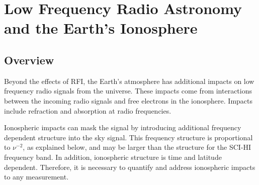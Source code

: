 \chapter{Low Frequency Radio Astronomy and the Earth's Ionosphere}\label{Ch:Iono}


\section{Overview}

Beyond the effects of RFI, the Earth's atmosphere has additional impacts on low frequency radio signals from the universe. These impacts come from interactions between the incoming radio signals and free electrons in the ionosphere. Impacts include refraction and absorption at radio frequencies. 

Ionospheric impacts can mask the \cm signal by introducing additional frequency dependent structure into the sky signal. This frequency structure is proportional to $\nu^{-2}$, as explained below, and may be larger than the \cm structure for the SCI-HI frequency band. In addition, ionospheric structure is time and latitude dependent. Therefore, it is necessary to quantify and address ionospheric impacts to any \cm measurement. 

